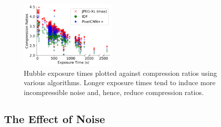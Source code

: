 
\begin{figure}
    \centering
    \includegraphics[width=0.42\textwidth]{figs/hubble_exposure_time.png}
    \caption{Hubble exposure times plotted against compression ratios using various algorithms. Longer exposure times tend to induce more incompressible noise and, hence, reduce compression ratios.}
    \label{fig:exposure_vs_compression}
    \vspace{-1em}
\end{figure}

\subsection{The Effect of Noise}
\label{sec:noise-effect}


